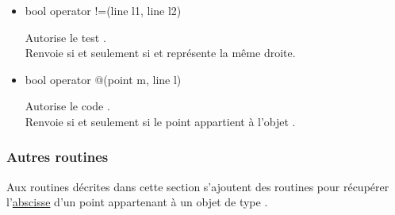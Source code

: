 \documentclass[pdftex]{article}
\newcommand{\ssi}{si et seulement si\xspace}
\begin{document}
\begin{itemize}
\item {}%
    \begin{Vcolor}
    bool operator !=(line l1, line l2)
  \end{Vcolor}
  Autorise le test .\\
  Renvoie  \ssi {} et  représente la même droite.
\item {}%
    \begin{Vcolor}
    bool operator @(point m, line l)
  \end{Vcolor}
  Autorise le code .\\
  Renvoie  \ssi le point  appartient à l'objet .
\end{itemize}

\subsubsection{Autres routines}
Aux routines décrites dans cette section s'ajoutent des routines
pour récupérer l'\href{#section.abscissa}{abscisse} d'un point
appartenant à un objet de type .
\end{document}
